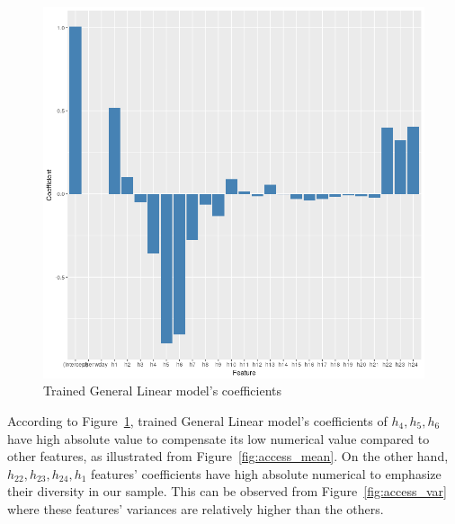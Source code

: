 \documentclass[English]{dicomopapers}
\begin{document}
\begin{figure}[ht]
  \vspace*{-0.5cm}
  \centering
  \includegraphics[width=\columnwidth,natwidth=827,natheight=805]{glm_coef.png}
  \caption{Trained General Linear model's coefficients}\label{fig:glm_coef}
\end{figure}
 According to Figure~\ref{fig:glm_coef}, trained General Linear model's coefficients of \(h_4, h_5, h_6\) have high absolute value to compensate its low numerical value compared to other features, as illustrated from Figure~\ref{fig:access_mean}. On the other hand, \(h_{22}, h_{23}, h_{24}, h_1\) features' coefficients have high absolute numerical to emphasize their diversity in our sample. This can be observed from Figure~\ref{fig:access_var} where these features' variances are relatively higher than the others.\newline
\end{document}
